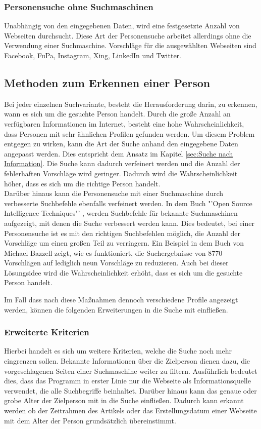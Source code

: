 		\subsubsection{Personensuche ohne Suchmaschinen}
		\label{subsubsec:PersonensucheohneSuchmaschine}
		Unabhängig von den eingegebenen Daten, wird eine festgesetzte Anzahl von Webseiten durchsucht. Diese Art der Personensuche arbeitet allerdings ohne die Verwendung einer Suchmaschine. Vorschläge für die ausgewählten Webseiten sind Facebook, FuPa, Instagram, Xing, LinkedIn und Twitter.

	
	\subsection{Methoden zum Erkennen einer Person}
	\label{sec:WannhandeltessichumdiegesuchtePerson}
	Bei jeder einzelnen Suchvariante, besteht die Herausforderung darin, zu erkennen, wann es sich um die gesuchte Person handelt. Durch die große Anzahl an verfügbaren Informationen im Internet, besteht eine hohe Wahrscheinlichkeit, dass Personen mit sehr ähnlichen Profilen gefunden werden. Um diesem Problem entgegen zu wirken, kann die Art der Suche anhand den eingegebene Daten angepasst werden. Dies entspricht dem Ansatz im Kapitel \ref{sec:Suche nach Information}. Die Suche kann dadurch verfeinert werden und die Anzahl der fehlerhaften Vorschläge wird geringer. Dadurch wird die Wahrscheinlichkeit höher, dass es sich um die richtige Person handelt.\\
	Darüber hinaus kann die Personensuche mit einer Suchmaschine durch verbesserte Suchbefehle ebenfalls verfeinert werden. In dem Buch "'Open Source Intelligence Techniques"' \cite{Bazzell}, werden Suchbefehle für bekannte Suchmaschinen aufgezeigt, mit denen die Suche verbessert werden kann. Dies bedeutet, bei einer Personensuche ist es mit den richtigen Suchbefehlen möglich, die Anzahl der Vorschläge um einen großen Teil zu verringern. Ein Beispiel in dem Buch von Michael Bazzell zeigt, wie es funktioniert, die Suchergebnisse von 8770 Vorschlägen auf lediglich neun Vorschläge zu reduzieren.\cite{Bazzell} 
	Auch bei dieser Lösungsidee wird die Wahrscheinlichkeit erhöht, dass es sich um die gesuchte Person handelt.
	
	Im Fall dass nach diese Maßnahmen dennoch verschiedene Profile angezeigt werden, können die folgenden Erweiterungen in die Suche mit einfließen.
		\subsubsection{Erweiterte Kriterien}
		\label{sec:ErweiterteKriteriern}
		Hierbei handelt es sich um weitere Kriterien, welche die Suche noch mehr eingrenzen sollen. Bekannte Informationen über die Zielperson dienen dazu, die vorgeschlagenen Seiten einer Suchmaschine weiter zu filtern. Ausführlich bedeutet dies, dass das Programm in erster Linie nur die Webseite als Informationsquelle verwendet, die alle Suchbegriffe beinhaltet. Darüber hinaus kann das genaue oder grobe Alter der Zielperson mit in die Suche einfließen. Dadurch kann erkannt werden ob der Zeitrahmen des Artikels oder das Erstellungsdatum einer Webseite mit dem Alter der Person grundsätzlich übereinstimmt.
